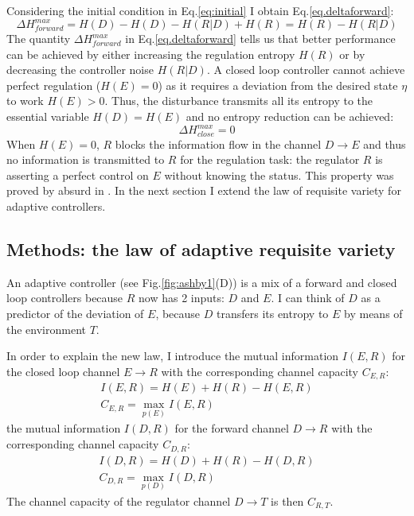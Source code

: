 Considering the initial condition in Eq.\ref{eq:initial} I obtain Eq.\ref{eq.deltaforward}:
\begin{equation}
\Delta H^{max}_{forward}=H(D)-H(D)-H(R|D)+H(R)=H(R)-H(R|D)
\end{equation}
The quantity $\Delta H^{max}_{forward}$ in Eq.\ref{eq.deltaforward} tells us that
better performance can be achieved by either increasing the regulation entropy
$H(R)$ or by decreasing the controller noise $H(R|D)$.
A closed loop controller cannot achieve perfect regulation ($H(E)=0$) as it requires
a deviation from the desired state $\eta$ to work $H(E)>0$.
Thus, the disturbance transmits all its entropy to the essential variable $H(D)=H(E)$
and no entropy reduction can be achieved:
\begin{equation}
\Delta H^{max}_{close}=0\label{eq.deltaclosed}
\end{equation}
When $H(E)=0$, $R$ blocks the information flow in the channel $D\rightarrow E$
and thus no information is transmitted to $R$ for the regulation task: the regulator $R$
is asserting a perfect control on $E$ without knowing the status.
This property was proved by absurd in \citet{Ashby1956:IntroCybernetics}.
In the next section I extend the law of requisite variety for adaptive controllers.

\subsection{Methods: the law of adaptive requisite variety}
An adaptive controller (see Fig.\ref{fig:ashby1}(D)) is a mix of a forward
\citep{feed-forward} and closed loop controllers \citep{PID} because $R$ now has
2 inputs: $D$ and $E$. I can think of $D$ as a predictor of the deviation
of $E$, because $D$ transfers its entropy to $E$ by means of the environment $T$.

In order to explain the new law, I introduce the mutual information $I(E,R)$
for the closed loop channel $E\rightarrow R$ with the corresponding channel
capacity $C_{E,R}$:
\begin{eqnarray}
I(E,R)=H(E)+H(R)-H(E,R)\\
C_{E,R}=\max_{p(E)} I(E,R)
\end{eqnarray}
the mutual information $I(D,R)$ for the forward channel $D\rightarrow R$ with the
corresponding channel capacity $C_{D,R}$:
\begin{eqnarray}
I(D,R)=H(D)+H(R)-H(D,R)\\
C_{D,R}=\max_{p(D)} I(D,R)
\end{eqnarray}
The channel capacity of the regulator channel $D \rightarrow T$ is then $C_{R,T}$.

